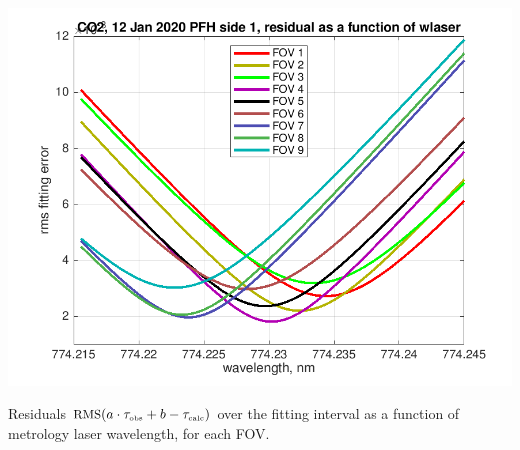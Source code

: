 \documentclass[10pt]{beamer}
\begin{document}
\begin{frame}
\begin{columns}[t]
\begin{column}{0.5\textwidth}
  \begin{centering}
  \includegraphics[width=\textwidth]{01-12_pfh_s1_CO2/CO2_wlaser_fit.png}
  \end{centering}\vspace{3mm}

Residuals $\mbox{\small RMS}(a\cdot\tau_{\mbox{\tiny obs}} + b - \tau_{\mbox{\tiny calc}})$ over the fitting
interval as a function of metrology laser wavelength, for each FOV.

\end{column}
\end{columns}
\end{frame}
\end{document}

